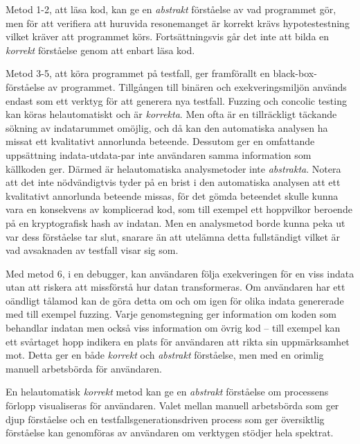 Metod 1-2, att läsa kod, kan ge en \textit{abstrakt} förståelse av vad programmet gör, men för
att verifiera att huruvida resonemanget är korrekt krävs hypotestestning vilket
kräver att programmet körs. Fortsättningsvis går det inte att bilda en \textit{korrekt} förståelse genom 
att enbart läsa kod.

Metod 3-5, att köra programmet på testfall, ger framförallt en black-box-förståelse av
programmet. Tillgången till binären och exekveringsmiljön används endast som ett verktyg
för att generera nya testfall. Fuzzing och concolic testing kan köras helautomatiskt och är
\textit{korrekta}. Men ofta är en tillräckligt täckande sökning av indatarummet omöjlig, och då kan
den automatiska analysen ha missat ett kvalitativt annorlunda beteende. Dessutom ger en omfattande
uppsättning indata-utdata-par inte användaren samma information som källkoden ger. Därmed är
helautomatiska analysmetoder inte \textit{abstrakta}. Notera att det inte nödvändigtvis tyder på en
brist i den automatiska analysen att ett kvalitativt annorlunda beteende missas, för det gömda
beteendet skulle kunna vara en konsekvens av komplicerad kod, som till exempel ett hoppvilkor
beroende på en kryptografisk hash av indatan. Men en analysmetod borde kunna peka ut var dess
förståelse tar slut, snarare än att utelämna detta fullständigt vilket är vad avsaknaden av testfall
visar sig som.

Med metod 6, i en debugger, kan användaren följa exekveringen för en viss indata utan att riskera
att missförstå hur datan transformeras. Om användaren har ett oändligt tålamod kan de göra detta om
och om igen för olika indata genererade med till exempel fuzzing. Varje genomstegning ger
information om koden som behandlar indatan men också viss information om övrig kod -- till exempel
kan ett svårtaget hopp indikera en plats för användaren att rikta sin uppmärksamhet mot. Detta ger
en både \textit{korrekt} och \textit{abstrakt} förståelse, men med en orimlig manuell arbetsbörda
för användaren.

En helautomatisk \textit{korrekt} metod kan ge en \textit{abstrakt} förståelse om processens förlopp
visualiseras för användaren. Valet mellan manuell arbetsbörda som ger djup förståelse och en
testfallsgenerationsdriven process som ger översiktlig förståelse kan genomföras av användaren om
verktygen stödjer hela spektrat.
